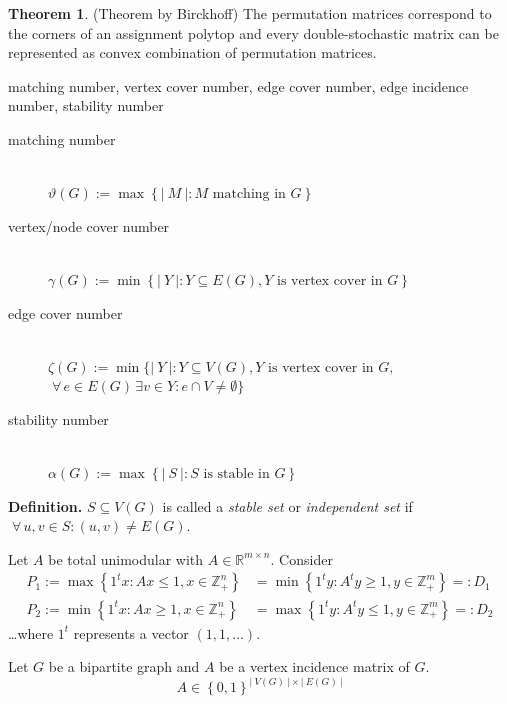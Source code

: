 \documentclass[a4paper]{article}
\theoremstyle{definition}
\newtheorem{theorem}{Theorem}
\newcommand{\card}[1]{\left|\:\!#1\:\!\right|}
\newcommand{\set}[1]{\left\{#1\right\}}
\newcommand{\fall}{\;\forall\,}
\begin{document}
\begin{theorem}
  (Theorem by Birckhoff)
  The permutation matrices correspond to the corners of an assignment polytop and every double-stochastic matrix can be represented as convex combination of permutation matrices.
\end{theorem}

matching number, vertex cover number, edge cover number, edge incidence number, stability number

\begin{description}
  \item[matching number]\hfill{} \\
    $\vartheta(G) := \max\set{\card{M}: M \text{ matching in } G}$
  \item[vertex/node cover number]\hfill{} \\
    $\gamma(G) := \min\set{\card{Y}: Y \subseteq E(G), Y \text{ is vertex cover in } G}$
  \item[edge cover number]\hfill{} \\
    $\zeta(G) := \min\{\card{Y}: Y \subseteq V(G), Y \text{ is vertex cover in } G, $ \\
    $\fall e \in E(G) \,\exists v \in Y: e \cap V \neq \emptyset\}$
  \item[stability number]\hfill{} \\
    $\alpha(G) := \max\set{\card{S}: S \text{ is stable in } G}$
\end{description}

\textbf{Definition.}
  $S \subseteq V(G)$ is called a \emph{stable set} or \emph{independent set} if $\fall u,v \in S: (u,v) \neq E(G)$.

Let $A$ be total unimodular with $A \in \mathbb{R}^{m \times n}$.
Consider \begin{align*}
  P_1 := \max\set{
    1^t x:
    Ax \leq 1, x \in \mathbb{Z}_+^n
  } &= \min\set{
    1^t y: A^t y \geq 1, y \in \mathbb{Z}_+^m
  } =: D_1 \\
  P_2 := \min\set{
    1^t x: Ax \geq 1, x \in \mathbb{Z}_+^n
  } &= \max\set{
    1^t y: A^t y \leq 1, y \in \mathbb{Z}_+^m
  } =: D_2
\end{align*}
\dots where $1^t$ represents a vector $(1,1,\ldots)$.

Let $G$ be a bipartite graph and $A$ be a vertex incidence matrix of $G$.
\[
  A \in \set{0,1}^{\card{V(G)} \times \card{E(G)}}
\]
\end{document}
